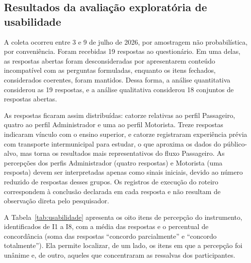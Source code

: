 \documentclass[a4paper,12pt]{article}
\begin{document}
\subsection{Resultados da avaliação exploratória de usabilidade}
\label{sec:avaliacao}

A coleta ocorreu entre 3 e 9 de julho de 2026, por amostragem não probabilística, por conveniência. Foram recebidas 19 respostas ao questionário. Em uma delas, as respostas abertas foram desconsideradas por apresentarem conteúdo incompatível com as perguntas formuladas, enquanto os itens fechados, considerados coerentes, foram mantidos. Dessa forma, a análise quantitativa considerou as 19 respostas, e a análise qualitativa considerou 18 conjuntos de respostas abertas.

As respostas ficaram assim distribuídas: catorze relativas ao perfil Passageiro, quatro ao perfil Administrador e uma ao perfil Motorista. Treze respostas indicaram vínculo com o ensino superior, e catorze registraram experiência prévia com transporte intermunicipal para estudar, o que aproxima os dados do público-alvo, mas torna os resultados mais representativos do fluxo Passageiro. As percepções dos perfis Administrador (quatro respostas) e Motorista (uma resposta) devem ser interpretadas apenas como sinais iniciais, devido ao número reduzido de respostas desses grupos. Os registros de execução do roteiro correspondem à conclusão declarada em cada resposta e não resultam de observação direta pelo pesquisador.

A Tabela~\ref{tab:usabilidade} apresenta os oito itens de percepção do instrumento, identificados de I1 a I8, com a média das respostas e o percentual de concordância (soma das respostas ``concordo parcialmente'' e ``concordo totalmente''). Ela permite localizar, de um lado, os itens em que a percepção foi unânime e, de outro, aqueles que concentraram as ressalvas dos participantes.
\end{document}

